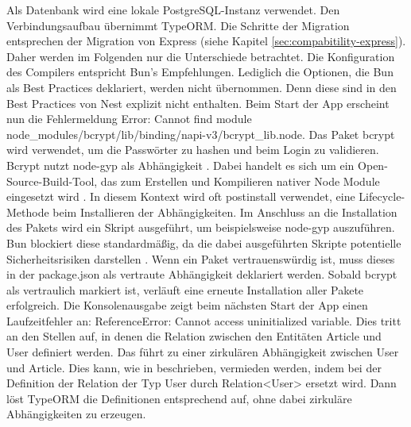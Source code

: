 \noindent
Als Datenbank wird eine lokale PostgreSQL-Instanz verwendet. Den Verbindungsaufbau übernimmt TypeORM. Die Schritte der Migration entsprechen der Migration von Express (siehe Kapitel \ref{sec:compabitility-express}). Daher werden im Folgenden nur die Unterschiede betrachtet. Die Konfiguration des Compilers entspricht Bun's Empfehlungen. Lediglich die Optionen, die Bun als Best Practices deklariert, werden nicht übernommen. Denn diese sind in den Best Practices von Nest explizit nicht enthalten. \newline
Beim Start der App erscheint nun die Fehlermeldung \glq Error: Cannot find module node\_modules/bcrypt/lib/binding/napi-v3/bcrypt\_lib.node\grq{}. Das Paket \glq bcrypt\grq{} wird verwendet, um die Passwörter zu hashen und beim Login zu validieren. \glq Bcrypt\grq{} nutzt \glq node-gyp\grq{} als Abhängigkeit \cite{DelGobbo.2018}. Dabei handelt es sich um ein Open-Source-Build-Tool, das zum Erstellen und Kompilieren nativer Node Module eingesetzt wird \cite{OpenJSFoundation.o.J.c}. In diesem Kontext wird oft \glq postinstall\grq{} verwendet, eine Lifecycle-Methode beim Installieren der Abhängigkeiten. Im Anschluss an die Installation des Pakets wird ein Skript ausgeführt, um beispielsweise \glq node-gyp\grq{} auszuführen. Bun blockiert diese standardmäßig, da die dabei ausgeführten Skripte potentielle Sicherheitsrisiken darstellen \cite{OvenSh.2023}. Wenn ein Paket vertrauenswürdig ist, muss dieses in der \glq package.json\grq{} als vertraute Abhängigkeit deklariert werden. Sobald \glq bcrypt\grq{} als vertraulich markiert ist, verläuft eine erneute Installation aller Pakete erfolgreich.\newline
Die Konsolenausgabe zeigt beim nächsten Start der App einen Laufzeitfehler an: \glq ReferenceError: Cannot access uninitialized variable\grq{}. Dies tritt an den Stellen auf, in denen die Relation zwischen den Entitäten \glq Article\grq{} und \glq User\grq{} definiert werden. Das führt zu einer zirkulären Abhängigkeit zwischen \glq User\grq{} und \glq Article\grq{}. Dies kann, wie in \cite{TypeORM.} beschrieben, vermieden werden, indem bei der Definition der Relation der Typ \glq User\grq{} durch \glq Relation<User>\grq{} ersetzt wird. Dann löst TypeORM die Definitionen entsprechend auf, ohne dabei zirkuläre Abhängigkeiten zu erzeugen.\\

